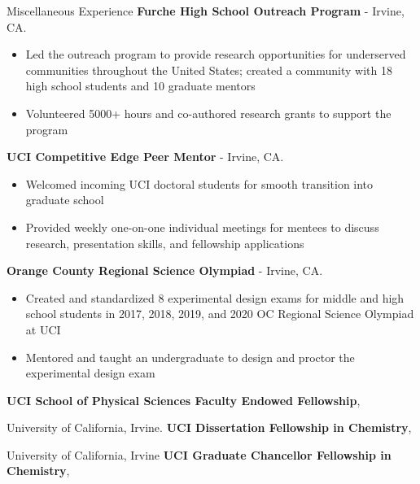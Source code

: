 \begin{rubric}{Miscellaneous Experience}
   \textbf{Furche High School Outreach Program} - Irvine, CA.
  \vspace{-0.5em}
   \begin{itemize}
     \itemsep-0.5em
   \item Led the outreach program to provide research opportunities for underserved communities
     throughout the United States; created a community with 18 high school students and
     10 graduate mentors
   \item Volunteered 5000+ hours and co-authored research grants to support the program
   \vspace{-1em}
   \end{itemize}
%
    \textbf{UCI Competitive Edge Peer Mentor} - Irvine, CA.
   \vspace{-0.5em}
   \begin{itemize}
   \itemsep-0.5em
   \item Welcomed incoming UCI doctoral students for smooth transition into graduate school
   \item Provided weekly one-on-one individual meetings for mentees to discuss research, presentation
     skills, and fellowship applications
   \vspace{-1em}
   \end{itemize}
%   
 \textbf{Orange County Regional Science Olympiad} - Irvine, CA.
\vspace{-0.5em}
   \begin{itemize}
   \itemsep-0.5em
   \item Created and standardized 8 experimental design exams for middle and high school students in
     2017, 2018, 2019, and 2020 OC Regional Science Olympiad at UCI
   \item Mentored and taught an undergraduate to design and proctor the experimental design exam
   \vspace{-1em}
   \end{itemize}
%
\entry*[Jun 2021] \textbf{UCI School of Physical Sciences Faculty Endowed Fellowship},

University of California, Irvine.
%
\entry*[Jun 2021] \textbf{UCI Dissertation Fellowship in Chemistry},

University of California, Irvine
%
\entry*[Sept 2016] \textbf{UCI Graduate Chancellor Fellowship in Chemistry},


\end{rubric}
